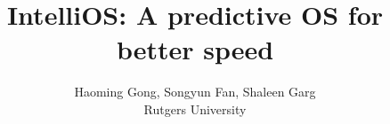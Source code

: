 \documentclass[letterpaper,twocolumn,10pt]{sty/z2-article}
\begin{document}
\date{}

\title{IntelliOS: A predictive OS for better speed
\vspace{-0.2in}}
\author{\rm
Haoming Gong, Songyun Fan,  Shaleen Garg
\\Rutgers University
} %


\makeatletter



\maketitle

\thispagestyle{empty}





%

%


 
\end{document}
